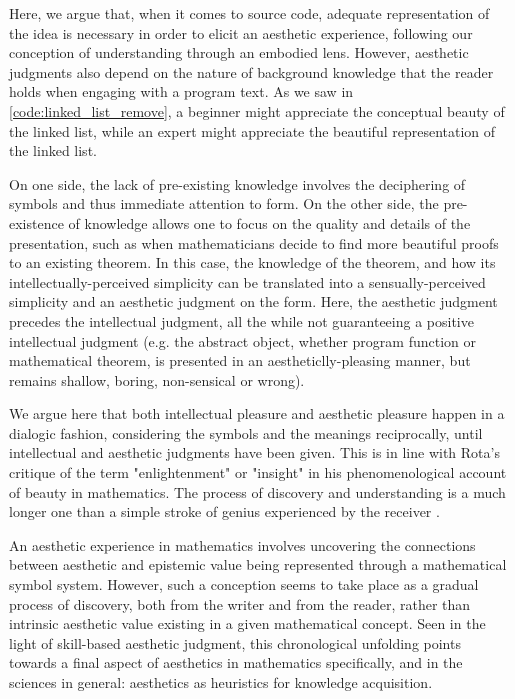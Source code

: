 Here, we argue that, when it comes to source code, adequate representation of the idea is necessary in order to elicit an aesthetic experience, following our conception of understanding through an embodied lens. However, aesthetic judgments also depend on the nature of background knowledge that the reader holds when engaging with a program text. As we saw in \autoref{code:linked_list_remove}, a beginner might appreciate the conceptual beauty of the linked list, while an expert might appreciate the beautiful representation of the linked list.

On one side, the lack of pre-existing knowledge involves the deciphering of symbols and thus immediate attention to form. On the other side, the pre-existence of knowledge allows one to focus on the quality and details of the presentation, such as when mathematicians decide to find more beautiful proofs to an existing theorem. In this case, the knowledge of the theorem, and how its intellectually-perceived simplicity can be translated into a sensually-perceived simplicity and an aesthetic judgment on the form. Here, the aesthetic judgment precedes the intellectual judgment, all the while not guaranteeing a positive intellectual judgment (e.g. the abstract object, whether program function or mathematical theorem, is presented in an aestheticlly-pleasing manner, but remains shallow, boring, non-sensical or wrong).

We argue here that both intellectual pleasure and aesthetic pleasure happen in a dialogic fashion, considering the symbols and the meanings reciprocally, until intellectual and aesthetic judgments have been given. This is in line with Rota's critique of the term "enlightenment" or "insight" in his phenomenological account of beauty in mathematics. The process of discovery and understanding is a much longer one than a simple stroke of genius experienced by the receiver \citep{rota_phenomenology_1997}.

An aesthetic experience in mathematics involves uncovering the connections between aesthetic and epistemic value being represented through a mathematical symbol system. However, such a conception seems to take place as a gradual process of discovery, both from the writer and from the reader, rather than intrinsic aesthetic value existing in a given mathematical concept. Seen in the light of skill-based aesthetic judgment, this chronological unfolding points towards a final aspect of aesthetics in mathematics specifically, and in the sciences in general: aesthetics as heuristics for knowledge acquisition.

